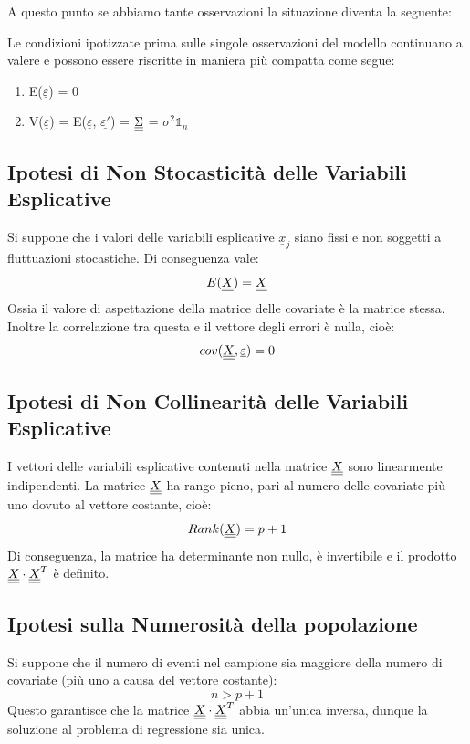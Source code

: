 A questo punto se abbiamo tante osservazioni la situazione diventa la seguente:

Le condizioni ipotizzate prima sulle singole osservazioni del modello continuano a valere e possono essere riscritte in maniera più compatta come segue:
\begin{enumerate}
	\item E($\underline{\varepsilon}$) = 0
	\item V($\underline{\varepsilon}$) = E($\underline{\varepsilon}$, $\underline{\varepsilon'}$) = $\underline{\underline{\Sigma}}$ = $\sigma^2 \mathds{1}_n$ 
\end{enumerate}


\subsection{Ipotesi di Non Stocasticità delle Variabili Esplicative}
Si suppone che i valori delle variabili esplicative $\underline{x}_j$ siano fissi e non soggetti a fluttuazioni stocastiche. Di conseguenza vale:
\begin{equation}
E(\underline{\underline{X}}) = \underline{\underline{X}}
\end{equation}
Ossia il valore di aspettazione della matrice delle covariate è la matrice stessa. Inoltre la correlazione tra questa e il vettore degli errori è nulla, cioè:
\begin{equation}
cov(\underline{\underline{X}},\underline{\varepsilon}) = 0
\end{equation}

\subsection{Ipotesi di Non Collinearità delle Variabili Esplicative}
I vettori delle variabili esplicative contenuti nella matrice $\underline{\underline{X}}$ sono linearmente indipendenti. La matrice $\underline{\underline{X}}$ ha rango pieno, pari al numero delle covariate più uno dovuto al vettore costante, cioè:
\begin{equation}
Rank(\underline{\underline{X}}) = p + 1
\end{equation}
Di conseguenza, la matrice ha determinante non nullo, è invertibile e il prodotto $\underline{\underline{X}}\cdot\underline{\underline{X}}^T$ è definito.

\subsection{Ipotesi sulla Numerosità della popolazione}
Si suppone che il numero di eventi nel campione sia maggiore della numero di covariate (più uno a causa del vettore costante):
\begin{equation}
n > p + 1
\end{equation}
Questo garantisce che la matrice $\underline{\underline{X}} \cdot \underline{\underline{X}}^T$ abbia un'unica inversa, dunque la soluzione al problema di regressione sia unica.


